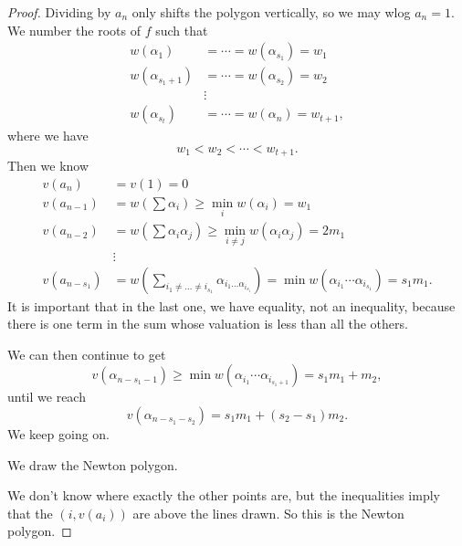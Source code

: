 \documentclass[a4paper]{article}
\begin{document}
\begin{proof}
  Dividing by $a_n$ only shifts the polygon vertically, so we may wlog $a_n = 1$. We number the roots of $f$ such that
  \begin{align*}
    w(\alpha_1) &= \cdots = w(\alpha_{s_1}) = w_1\\
    w(\alpha_{s_1 + 1}) &= \cdots = w(\alpha_{s_2}) = w_2\\
    &\vdots\\
    w(\alpha_{s_t}) &= \cdots = w(\alpha_n) = w_{t + 1},
  \end{align*}
  where we have
  \[
    w_1 < w_2 < \cdots < w_{t + 1}.
  \]
  Then we know
  \begin{align*}
    v(a_n) &= v(1) = 0\\
    v(a_{n - 1}) &= w\left(\sum \alpha_i\right) \geq \min_i w(\alpha_i) = w_1\\
    v(a_{n - 2}) &= w\left(\sum \alpha_i\alpha_j\right) \geq \min_{i \not= j} w(\alpha_i \alpha_j) = 2 m_1\\
    &\vdots\\
    v(a_{n - s_1}) &= w\left(\sum_{i_1\not=\ldots \not=i_{s_1}} \alpha_{i_1 \ldots \alpha_{i_{s_1}}}\right) = \min w(\alpha_{i_1}\cdots\alpha_{i_{s_1}}) = s_1 m_1.
  \end{align*}
  It is important that in the last one, we have equality, not an inequality, because there is one term in the sum whose valuation is less than all the others.

  We can then continue to get
  \[
    v(\alpha_{n - s_1 - 1}) \geq \min w(\alpha_{i_1} \cdots \alpha_{i_{s_1 + 1}}) = s_1 m_1 + m_2,
  \]
  until we reach
  \[
    v(\alpha_{n - s_1 - s_2}) = s_1 m_1 + (s_2 - s_1) m_2.
  \]
  We keep going on.

  We draw the Newton polygon.
  \begin{center}
  \end{center}
  We don't know where exactly the other points are, but the inequalities imply that the $(i, v(a_i))$ are above the lines drawn. So this is the Newton polygon.


\end{proof}
\end{document}
